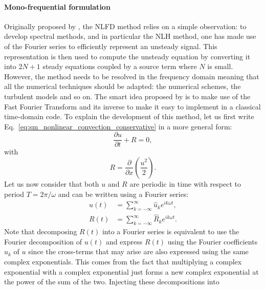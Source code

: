 
\paragraph{Mono-frequential formulation}

Originally proposed by \citet{McMullen2001}, the NLFD
method relies on a simple observation: to develop spectral methods, and in
particular the NLH method, one has made use of the Fourier
series to efficiently represent an unsteady signal.
This representation is then used to compute the unsteady
equation by converting it into $2N+1$ steady equations coupled by a 
source term where $N$ is small.
However, the method needs to be resolved in the frequency domain meaning
that all the numerical techniques should be adapted: the numerical schemes,
the turbulent models and so on. The smart idea 
proposed by \citet{McMullen2001} is to
make use of the Fast Fourier Transform and its inverse to
make it easy to implement in a classical time-domain code.
To explain the development of this method, let us first 
write Eq.~\ref{eq:sm_nonlinear_convection_conservative} 
in a more general form:
\begin{equation}
	\frac{\partial u}{\partial t} + R = 0,
	\label{eq:sm_nonlinear_convection_residual}
\end{equation}
with
\begin{equation}
	R = \frac{\partial}{\partial x} \left( 
	\frac{u^2}{2} \right).
\end{equation}
Let us now consider that both $u$ and $R$ are periodic
in time with respect to period $T = 2 \pi / \omega$
and can be written using a Fourier series:
\begin{equation}
	\begin{split}
		u(t) &= \sum_{k=-\infty}^{\infty} \widehat{u}_k e^{i k \omega t}, \\
		R(t) &= \sum_{k=-\infty}^{\infty} \widehat{R}_k e^{i k \omega t}.
	\end{split}
\end{equation}
Note that decomposing $R(t)$ into a Fourier series is equivalent
to use the Fourier decomposition of $u(t)$ and express
$R(t)$ using the Fourier coefficients $\widehat{u}_k$ of $u$
since the cross-terms that may arise are also expressed 
using the same complex exponentials. This comes from the fact
that multiplying a complex exponential with a complex exponential
just forms a new complex exponential at the power of the sum of the
two.
Injecting these decompositions into 
